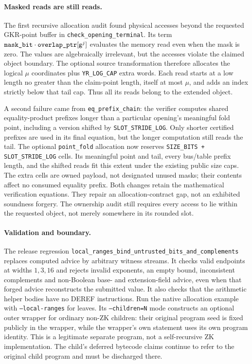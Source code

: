 \paragraph{Masked reads are still reads.} The first recursive allocation audit found physical accesses beyond the requested GKR-point buffer in \texttt{check\_opening\_terminal}. Its term $\texttt{mask\_bit}\cdot\texttt{overlap\_ptr}[\mathsf{g}^j]$ evaluates the memory read even when the mask is zero. The values are algebraically irrelevant, but the accesses violate the claimed object boundary. The optional source transformation therefore allocates the logical $\mu$ coordinates plus \texttt{YR\_LOG\_CAP} extra words. Each read starts at a low length no greater than the claim-point length, itself at most $\mu$, and adds an index strictly below that tail cap. Thus all its reads belong to the extended object.

A second failure came from \texttt{eq\_prefix\_chain}: the verifier computes shared equality-product prefixes longer than a particular opening's meaningful fold point, including a version shifted by \texttt{SLOT\_STRIDE\_LOG}. Only shorter certified prefixes are used in its final equation, but the longer computation still reads the tail. The optional \texttt{point\_fold} allocation now reserves \texttt{SIZE\_BITS + SLOT\_STRIDE\_LOG} cells. Its meaningful point and tail, every bus/table prefix length, and the shifted reads fit this extent under the existing public size caps. The extra cells are owned payload, not designated unused masks; their contents affect no consumed equality prefix. Both changes retain the mathematical verification equations. They repair an allocation-contract gap, not an exhibited soundness forgery. The ownership audit still requires every access to lie within the requested object, not merely somewhere in its rounded slot.

\paragraph{Validation and boundary.} The release regression \nolinkurl{local_ranges_bind_untrusted_bits_and_complements} replaces computed advice by arbitrary witness streams. It checks valid endpoints at widths $1,3,16$ and rejects invalid exponents, an empty bound, inconsistent complements and non-Boolean base- and extension-field advice, even when that forged advice reconstructs the submitted value. It also checks that the arithmetic helper bodies have no DEREF instructions. Run the native allocation example with \texttt{--local-ranges} for leaves. Its \texttt{--children=N} mode constructs an optional outer wrapper for ordinary non-ZK children: their original program seed is fixed publicly in the wrapper, while the wrapper's own statement uses its own program identity. This is a legitimate separate program, not a self-recursive ZK implementation. The child's deferred bytecode claims continue to refer to the original child program and must be discharged there.

